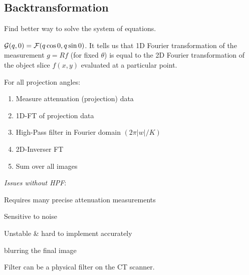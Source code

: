 \subsection{Backtransformation}
Find better way to solve the system of equations.

\begin{definition}
  \(\mathcal{G}(q, 0) = \operatorname{\mathcal{F}}(q \cos 0, q \sin 0)\). It tells us that 1D Fourier transformation of the measurement \(g = Rf\) (for fixed \(\theta\)) is equal to the 2D Fourier transformation of the object slice \(f(x, y)\) evaluated at a particular point.
\end{definition}

\begin{algorithm}
  For all projection angles:
  \begin{enumerate}
    \item Measure attenuation (projection) data
    \item 1D-FT of projection data
    \item High-Pass filter in Fourier domain \((2 \pi |w| / K)\)
    \item 2D-Inverser FT
    \item Sum over all images
  \end{enumerate}

  \textit{Issues without HPF}:
  \begin{itemize*}
    \item Requires many precise attenuation measurements
    \item Sensitive to noise
    \item Unstable \& hard to implement accurately
    \item blurring the final image
  \end{itemize*}

  Filter can be a physical filter on the CT scanner.
\end{algorithm}
